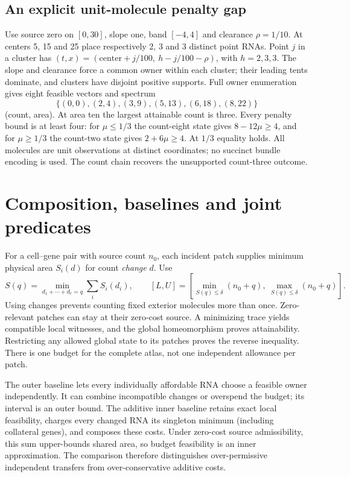 \documentclass[10pt,letterpaper]{article}
\begin{document}
\subsection{An explicit unit-molecule penalty gap}
Use source zero on $[0,30]$, slope one, band $[-4,4]$ and clearance $\rho=1/10$. At centers 5, 15 and 25 place respectively 2, 3 and 3 distinct point RNAs. Point $j$ in a cluster has $(t,x)=(\text{center}+j/100,\ h-j/100-\rho)$, with $h=2,3,3$. The slope and clearance force a common owner within each cluster; their leading tents dominate, and clusters have disjoint positive supports. Full owner enumeration gives eight feasible vectors and spectrum
\[
 \{(0,0),(2,4),(3,9),(5,13),(6,18),(8,22)\}
\]
(count, area). At area ten the largest attainable count is three. Every penalty bound is at least four: for $\mu\le1/3$ the count-eight state gives $8-12\mu\ge4$, and for $\mu\ge1/3$ the count-two state gives $2+6\mu\ge4$. At $1/3$ equality holds. All molecules are unit observations at distinct coordinates; no succinct bundle encoding is used. The count chain recovers the unsupported count-three outcome.

\section{Composition, baselines and joint predicates}
For a cell--gene pair with source count $n_0$, each incident patch supplies minimum physical area $S_i(d)$ for count \emph{change} $d$. Use
\[
 S(q)=\min_{d_1+\cdots+d_r=q}\sum_iS_i(d_i),\qquad
 [L,U]=\left[\min_{S(q)\le\delta}(n_0+q),\ 
 \max_{S(q)\le\delta}(n_0+q)\right].
\]
Using changes prevents counting fixed exterior molecules more than once. Zero-relevant patches can stay at their zero-cost source. A minimizing trace yields compatible local witnesses, and the global homeomorphism proves attainability. Restricting any allowed global state to its patches proves the reverse inequality. There is one budget for the complete atlas, not one independent allowance per patch.

The outer baseline lets every individually affordable RNA choose a feasible owner independently. It can combine incompatible changes or overspend the budget; its interval is an outer bound. The additive inner baseline retains exact local feasibility, charges every changed RNA its singleton minimum (including collateral genes), and composes these costs. Under zero-cost source admissibility, this sum upper-bounds shared area, so budget feasibility is an inner approximation. The comparison therefore distinguishes over-permissive independent transfers from over-conservative additive costs.
\end{document}
